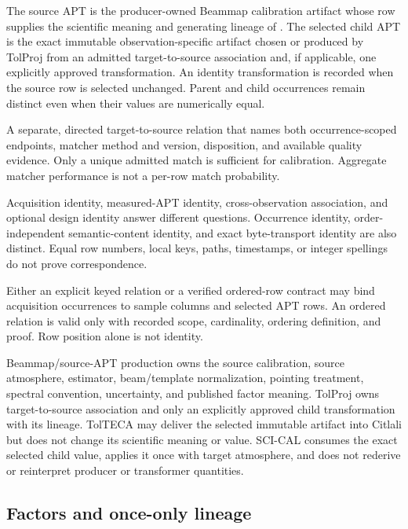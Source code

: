  The source APT is the
producer-owned Beammap calibration artifact whose row supplies the scientific
meaning and generating lineage of . The selected child APT is
the exact immutable observation-specific artifact chosen or produced by
TolProj from an admitted target-to-source association and, if applicable, one
explicitly approved transformation. An identity transformation is recorded
when the source row is selected unchanged. Parent and child occurrences remain
distinct even when their values are numerically equal.

 A separate, directed target-to-source relation that
names both occurrence-scoped endpoints, matcher method and version,
disposition, and available quality evidence. Only a unique admitted match is
sufficient for calibration. Aggregate matcher performance is not a per-row
match probability.

 Acquisition identity, measured-APT identity,
cross-observation association, and optional design identity answer different
questions. Occurrence identity, order-independent semantic-content identity,
and exact byte-transport identity are also distinct. Equal row numbers, local
keys, paths, timestamps, or integer spellings do not prove correspondence.

 Either an explicit keyed relation or a verified ordered-row
contract may bind acquisition occurrences to sample columns and selected APT
rows. An ordered relation is valid only with recorded scope, cardinality,
ordering definition, and proof. Row position alone is not identity.

 Beammap/source-APT
production owns the source calibration, source atmosphere, estimator,
beam/template normalization, pointing treatment, spectral convention,
uncertainty, and published factor meaning. TolProj owns target-to-source
association and only an explicitly approved child transformation with its
lineage. TolTECA may deliver the selected immutable artifact into Citlali but
does not change its scientific meaning or value. SCI-CAL consumes the exact
selected child value, applies it once with target atmosphere, and does not
rederive or reinterpret producer or transformer quantities.

\subsection{Factors and once-only lineage}

